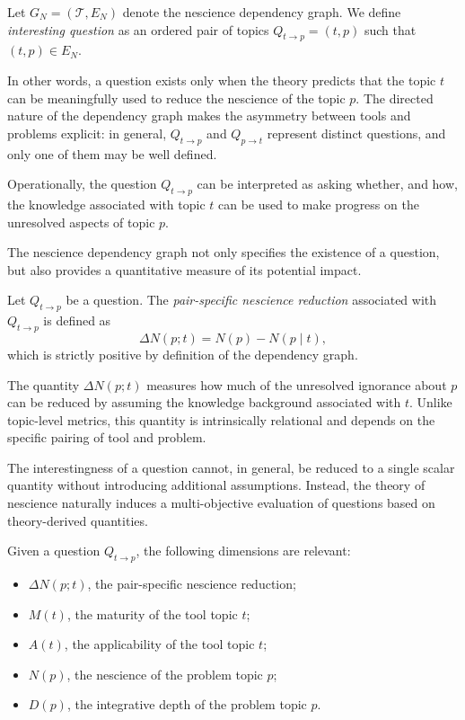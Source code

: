 \begin{definition}
Let $G_N = (\mathcal{T}, E_N)$ denote the nescience dependency graph. We define \emph{interesting question} as an ordered pair of topics $Q_{t \to p} = (t,p)$ such that $(t,p) \in E_N$.
\end{definition}

\noindent
In other words, a question exists only when the theory predicts that the topic $t$ can be meaningfully used to reduce the nescience of the topic $p$. The directed nature of the dependency graph makes the asymmetry between tools and problems explicit: in general, $Q_{t \to p}$ and $Q_{p \to t}$ represent distinct questions, and only one of them may be well defined.

Operationally, the question $Q_{t \to p}$ can be interpreted as asking whether, and how, the knowledge associated with topic $t$ can be used to make progress on the unresolved aspects of topic $p$.

The nescience dependency graph not only specifies the existence of a question, but also provides a quantitative measure of its potential impact.

\begin{definition}
Let $Q_{t \to p}$ be a question. The \emph{pair-specific nescience reduction} associated with $Q_{t \to p}$ is defined as
\[
\Delta N(p;t) = N(p) - N(p \mid t),
\]
which is strictly positive by definition of the dependency graph.
\end{definition}

\noindent
The quantity $\Delta N(p;t)$ measures how much of the unresolved ignorance about $p$ can be reduced by assuming the knowledge background associated with $t$. Unlike topic-level metrics, this quantity is intrinsically relational and depends on the specific pairing of tool and problem.

The interestingness of a question cannot, in general, be reduced to a single scalar quantity without introducing additional assumptions. Instead, the theory of nescience naturally induces a multi-objective evaluation of questions based on theory-derived quantities.

Given a question $Q_{t \to p}$, the following dimensions are relevant:

\begin{itemize}
\item $\Delta N(p;t)$, the pair-specific nescience reduction;
\item $M(t)$, the maturity of the tool topic $t$;
\item $A(t)$, the applicability of the tool topic $t$;
\item $N(p)$, the nescience of the problem topic $p$;
\item $D(p)$, the integrative depth of the problem topic $p$.
\end{itemize}

